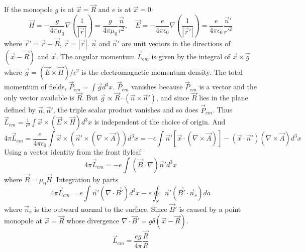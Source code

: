 \documentclass{article}
\begin{document}
	If the monopole $g$ is at $\vec{x}=\vec{R}$ and $e$ is at $\vec{x}=0$:
	\begin{equation}
		\vec{H} = -\frac{g}{4\pi\mu_0} \nabla \left(\frac{1}{|\vec{r}|}\right) = \frac{g}{4\pi\mu_0} \frac{\vec{n}}{r^2}, \quad \vec{E} = -\frac{e}{4\pi\epsilon_0} \nabla \left(\frac{1}{|\vec{r}'|}\right) = \frac{e}{4\pi\epsilon_0} \frac{\vec{n}'}{r'^2}
	\end{equation}
	where $\vec{r}'=\vec{r}-\vec{R}$, $\vec{r}=|\vec{r}|$. $\vec{n}$ and $\vec{n}'$ are unit vectors in the directions of $(\vec{x}-\vec{R})$ and $\vec{x}$.
	The angular momentum $\vec{L}_{em}$ is given by the integral of $\vec{x} \times \vec{g}$ where $\vec{g} = (\vec{E} \times \vec{H})/c^2$ is the electromagnetic momentum density.
	The total momentum of fields, $\vec{P}_{em} = \int \vec{g} d^3x$. $\vec{P}_{em}$ vanishes because $\vec{P}_{em}$ is a vector and the only vector available is $\vec{R}$.
	But $\vec{g} \propto \vec{R} \cdot (\vec{n} \times \vec{n}')$, and since $\vec{R}$ lies in the plane defined by $\vec{n}, \vec{n}'$, the triple scalar product vanishes and so does $\vec{P}_{em}$.
	Thus $\vec{L}_{em} = \frac{1}{c^2} \int \vec{x} \times (\vec{E} \times \vec{H}) d^3x$ is independent of the choice of origin.
	And
	\begin{equation}
		4\pi \vec{L}_{em} = \frac{e}{4\pi\epsilon_0} \int \vec{x} \times (\vec{n}' \times (\nabla \times \vec{A})) d^3x = -\epsilon \int \vec{n}'[\vec{x}\cdot(\nabla\times\vec{A})] - (\vec{x}\cdot\vec{n}')(\nabla\times\vec{A}) d^3x
	\end{equation}
	Using a vector identity from the front flyleaf
	\begin{equation}
		4\pi \vec{L}_{em} = -e \int (\vec{B} \cdot \nabla) \vec{n}' d^3x
	\end{equation}
	where $\vec{B} = \mu_0\vec{H}$.
	Integration by parts
	\begin{equation}
		4\pi \vec{L}_{em} = e \int \vec{n}'(\nabla\cdot\vec{B}')d^3x - e \oint_S \vec{n}'(\vec{B}'\cdot\vec{n}_s)da
	\end{equation}
	where $\vec{n}_s$ is the outward normal to the surface. Since $\vec{B}'$ is caused by a point monopole at $\vec{x}=\vec{R}$ whose divergence $\nabla \cdot \vec{B}' = g\delta(\vec{x}-\vec{R})$.
	\begin{equation}
		\vec{L}_{em} = \frac{eg}{4\pi} \frac{\vec{R}}{R}
	\end{equation}
	
\end{document}
